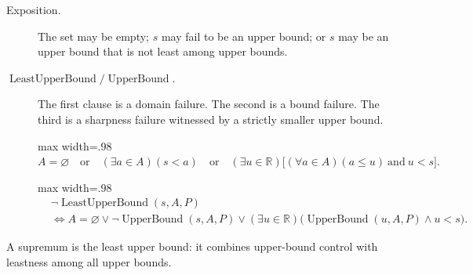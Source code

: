 \begin{remark*}
\begin{description}
  \item[Exposition.]
  The set may be empty; $s$ may fail to be an upper bound; or $s$ may be an
  upper bound that is not least among upper bounds.

  \item[\(\operatorname{LeastUpperBound} / \operatorname{UpperBound}.\)]
  The first clause is a domain failure.  The second is a bound failure.  The
  third is a sharpness failure witnessed by a strictly smaller upper bound.
  \begin{center}\begin{adjustbox}{max width=.98\linewidth}$\displaystyle A=\varnothing \quad\text{or}\quad (\exists a\in A)(s<a) \quad\text{or}\quad (\exists u\in\mathbb{R})\bigl[(\forall a\in A)(a\leq u)\ \text{and}\ u<s\bigr].$\end{adjustbox}\end{center}
  \begin{center}\begin{adjustbox}{max width=.98\linewidth}$\displaystyle \begin{aligned}&\neg\operatorname{LeastUpperBound}(s,A,P) \\ &\Longleftrightarrow A=\varnothing \lor \neg\operatorname{UpperBound}(s,A,P) \lor (\exists u\in\mathbb{R}) \bigl(\operatorname{UpperBound}(u,A,P)\land u<s\bigr).\end{aligned}$\end{adjustbox}\end{center}
\end{description}
\end{remark*}

\begin{remark*}[Interpretation]
A supremum is the least upper bound: it combines upper-bound control with leastness among all upper bounds.
\end{remark*}
